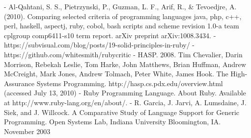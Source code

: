 \documentclass[twoside,twocolumn]{article}
\begin{document}
\begin{thebibliography}{99} %

 
\newblock - Al-Qahtani, S. S., Pietrzynski, P., Guzman, L. F., Arif, R., & Tevoedjre, A. (2010). Comparing selected criteria of programming languages java, php, c++, perl, haskell, aspectj, ruby, cobol, bash scripts and scheme revision 1.0-a team cplgroup comp6411-s10 term report. arXiv preprint arXiv:1008.3434.
\newblock - https://subvisual.com/blog/posts/19-solid-principles-in-ruby/
\newblock - https://github.com/whitesmith/rubycritic
\newblock - HASP. 2008. Tim Chevalier, Darin Morrison, Rebekah Leslie, Tom Harke, John Matthews, Brian Huffman, Andrew McCreight, Mark Jones, Andrew Tolmach, Peter White, James Hook. The High-Assurance Systems Programming.  http://hasp.cs.pdx.edu/overview.html (accessed July 13, 2010)
\newblock - Ruby Programming Language. About Ruby. Available at http://www.ruby-lang.org/en/about/. 
\newblock - R. Garcia, J. Jarvi, A. Lumsdaine, J. Siek, and J. Willcock. A Comparative Study of Language Support for Generic Programming. Open Systems Lab, Indiana University Bloomington, IA. November 2003
\newblock 
\end{thebibliography}

\end{document}
